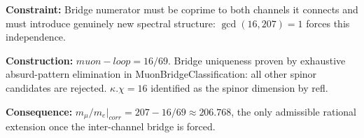 \documentclass[11pt,a4paper]{book}
\def\cdot{.}%
\def\mathrm#1{#1}%
\def\texttt#1{#1}%
\begin{document}
\medskip
\noindent
\textbf{Constraint:}
Bridge numerator must be coprime to both channels it connects and must introduce
genuinely new spectral structure: $\gcd(16, 207) = 1$ forces this independence.

\noindent
\textbf{Construction:}
$\texttt{muon-loop} = 16/69$.  Bridge uniqueness proven by exhaustive absurd-pattern
elimination in \texttt{MuonBridgeClassification}: all other spinor candidates are
rejected.  $\kappa \cdot \chi = 16$ identified as the spinor dimension by \texttt{refl}.

\noindent
\textbf{Consequence:}
$m_\mu / m_e|_{\mathrm{corr}} = 207 - 16/69 \approx 206.768$, the only admissible
rational extension once the inter-channel bridge is forced.

\begin{code}%
\>[0]\AgdaSpace{}%
\AgdaSymbol{:}\AgdaSpace{}%
\<%
\\
\>[0]\AgdaSpace{}%
\AgdaSymbol{=}\AgdaSpace{}%
%
\>[42]\<%
\\
%
\\[\AgdaEmptyExtraSkip]%
\>[0]\AgdaSpace{}%
\AgdaSymbol{:}\AgdaSpace{}%
\<%
\\
\>[0]\AgdaSpace{}%
\AgdaSymbol{=}\AgdaSpace{}%
%
\>[42]\<%
\\
%
\\[\AgdaEmptyExtraSkip]%
\>[0]\<%
\\
\>[0]\AgdaSpace{}%
\AgdaSymbol{:}\AgdaSpace{}%
\AgdaSpace{}%
\AgdaSpace{}%
\<%
\\
\>[0]\AgdaSpace{}%
\AgdaSymbol{=}\AgdaSpace{}%
\<%
\\
%
\\[\AgdaEmptyExtraSkip]%
\>[0]\<%
\\
\>[0]\AgdaSpace{}%
\AgdaSymbol{:}\AgdaSpace{}%
\AgdaSpace{}%
\AgdaSpace{}%
\<%
\\

\end{code}
\end{document}
